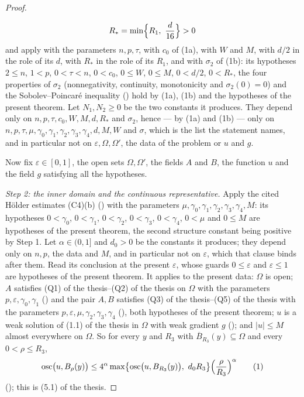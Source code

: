 \begin{proof}
\begin{enumerate}
  \[
  R_\ast=\min\Bigl\{R_1,\ \frac d{16}\Bigr\}>0
  \]
  and apply  with the parameters $n,p,\tau$,
  with $c_0$ of (1a), with $W$ and $M$, with $d/2$ in the role of its $d$, with
  $R_\ast$ in the role of its $R_1$, and with $\sigma_2$ of (1b): its hypotheses
  $2\le n$, $1<p$, $0<\tau<n$, $0<c_0$, $0\le W$, $0\le M$, $0<d/2$,
  $0<R_\ast$, the four properties of $\sigma_2$ (nonnegativity, continuity,
  monotonicity and $\sigma_2(0)=0$) and the Sobolev--Poincar\'e inequality
  () hold by (1a), (1b) and the hypotheses of
  the present theorem.  Let $N_1,N_2\ge0$ be the two constants it produces.
  They depend only on $n,p,\tau,c_0,W,M,d,R_\ast$ and $\sigma_2$, hence --- by
  (1a) and (1b) --- only on
  $n,p,\tau,\mu,\gamma_0,\gamma_1,\gamma_2,\gamma_3,\gamma_4,d,M,W$ and
  $\sigma$, which is the list the statement names, and in particular not on
  $\varepsilon,\Omega,\Omega'$, the data of the problem or $u$ and $g$.
\end{enumerate}

Now fix $\varepsilon\in[0,1]$, the open sets $\Omega,\Omega'$, the fields $A$ and
$B$, the function $u$ and the field $g$ satisfying all the hypotheses.

\emph{Step 2: the inner domain and the continuous representative.}  Apply the
cited H\"older estimates (C4)(b)
() with the parameters
$\mu,\gamma_0,\gamma_1,\gamma_2,\gamma_3,\gamma_4,M$: its hypotheses
$0<\gamma_0$, $0<\gamma_1$, $0<\gamma_2$, $0<\gamma_3$, $0<\gamma_4$, $0<\mu$
and $0\le M$ are hypotheses of the present theorem, the second structure
constant being positive by Step 1.  Let $\alpha\in(0,1]$ and $d_0>0$ be the
constants it produces; they depend only on $n,p$, the data and $M$, and in
particular not on $\varepsilon$, which that clause binds after them.  Read its
conclusion at the present $\varepsilon$, whose guards $0\le\varepsilon$ and
$\varepsilon\le1$ are hypotheses of the present theorem.  It applies to the
present data: $\Omega$ is open; $A$ satisfies
(Q1) of the thesis--(Q2) of the thesis on $\Omega$ with the parameters
$p,\varepsilon,\gamma_0,\gamma_1$ () and the pair
$A,B$ satisfies (Q3) of the thesis--(Q5) of the thesis with the parameters
$p,\varepsilon,\mu,\gamma_2,\gamma_3,\gamma_4$
(), both hypotheses of the present theorem; $u$ is
a weak solution of (1.1) of the thesis in $\Omega$ with weak gradient $g$
(); and $|u|\le M$ almost everywhere on $\Omega$.  So
for every $y$ and $R_3$ with $\overline B_{R_3}(y)\subseteq\Omega$ and every
$0<\rho\le R_3$,
\[
\operatorname*{osc}\bigl(u,B_\rho(y)\bigr)\le4^\alpha
\max\bigl\{\operatorname*{osc}\bigl(u,B_{R_3}(y)\bigr),\ d_0R_3\bigr\}
\Bigl(\frac\rho{R_3}\Bigr)^\alpha
\tag{1}
\]
(); this is (5.1) of the thesis.


\end{proof}
